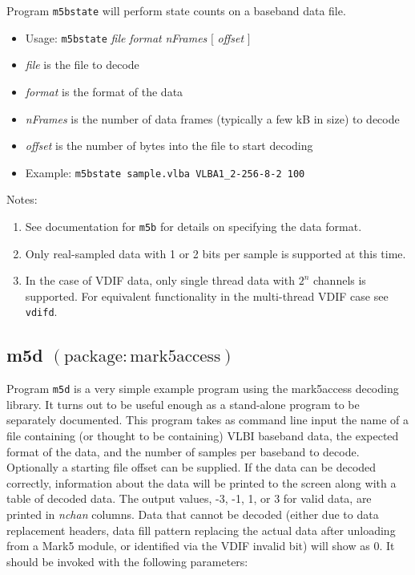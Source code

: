 Program {\tt m5bstate} will perform state counts on a baseband data file.

\begin{itemize}
\item[] Usage: {\tt m5bstate} {\em file} {\em format} {\em nFrames} $[$ {\em offset} $]$ 
\item[] {\em file} is the file to decode
\item[] {\em format} is the format of the data
\item[] {\em nFrames} is the number of data frames (typically a few kB in size) to decode
\item[] {\em offset} is the number of bytes into the file to start decoding
\item[] Example: {\tt m5bstate sample.vlba VLBA1\_2-256-8-2 100}
\end{itemize}

\noindent
Notes:
\begin{enumerate}
\item See documentation for {\tt m5b} for details on specifying the data format.
\item Only real-sampled data with 1 or 2 bits per sample is supported at this time.
\item In the case of VDIF data, only single thread data with $2^n$ channels is supported.
For equivalent functionality in the multi-thread VDIF case see {\tt vdifd}.
\end{enumerate}







\subsection{m5d {\small $\mathrm{(package: mark5access)}$}} \label{sec:m5d}

Program {\tt m5d} is a very simple example program using the mark5access decoding library.
It turns out to be useful enough as a stand-alone program to be separately documented.
This program takes as command line input the name of a file containing (or thought to be containing) VLBI baseband data, the expected format of the data, and the number of samples per baseband to decode.
Optionally a starting file offset can be supplied.
If the data can be decoded correctly, information about the data will be printed to the screen along with a table of decoded data.
The output values, -3, -1, 1, or 3 for valid data, are printed in {\em nchan} columns.
Data that cannot be decoded (either due to data replacement headers, data fill pattern replacing the actual data after unloading from a Mark5 module, or identified via the VDIF invalid bit) will show as 0.
It should be invoked with the following parameters:

